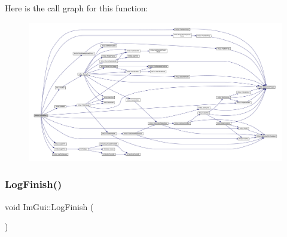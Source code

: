Here is the call graph for this function\+:
\nopagebreak
\begin{figure}[H]
\begin{center}
\leavevmode
\includegraphics[width=350pt]{namespace_im_gui_a7bd295da4be19bab98262c76fcaeb4fb_cgraph}
\end{center}
\end{figure}
\mbox{\label{namespace_im_gui_a2ebcd048d1ca025fb972e1c2e920e3f3}} 
\subsubsection{\texorpdfstring{Log\+Finish()}{LogFinish()}}
{\footnotesize\ttfamily void Im\+Gui\+::\+Log\+Finish (\begin{DoxyParamCaption}{ }\end{DoxyParamCaption})}

